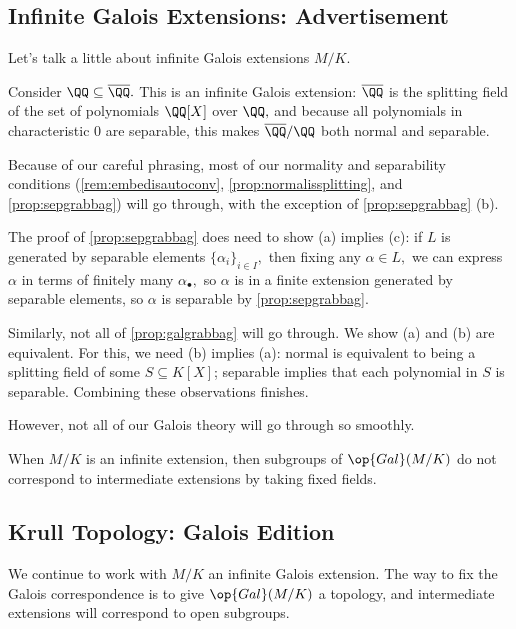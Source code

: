 \documentclass[../notes.tex]{subfiles}
\begin{document}
\subsection{Infinite Galois Extensions: Advertisement}
Let's talk a little about infinite Galois extensions $M/K.$
\begin{example}
	Consider $\QQ\subseteq\overline\QQ.$ This is an infinite Galois extension: $\overline\QQ$ is the splitting field of the set of polynomials $\QQ[X]$ over $\QQ,$ and because all polynomials in characteristic $0$ are separable, this makes $\overline\QQ/\QQ$ both normal and separable.
\end{example}
\begin{remark}[Nir]
	Because of our careful phrasing, most of our normality and separability conditions (\autoref{rem:embedisautoconv}, \autoref{prop:normalissplitting}, and \autoref{prop:sepgrabbag}) will go through, with the exception of \autoref{prop:sepgrabbag} (b).
	
	The proof of \autoref{prop:sepgrabbag} does need to show (a) implies (c): if $L$ is generated by separable elements $\{\alpha_i\}_{i\in I},$ then fixing any $\alpha\in L,$ we can express $\alpha$ in terms of finitely many $\alpha_\bullet,$ so $\alpha$ is in a finite extension generated by separable elements, so $\alpha$ is separable by \autoref{prop:sepgrabbag}.
\end{remark}
\begin{remark}[Nir]
	Similarly, not all of \autoref{prop:galgrabbag} will go through. We show (a) and (b) are equivalent. For this, we need (b) implies (a): normal is equivalent to being a splitting field of some $S\subseteq K[X]$; separable implies that each polynomial in $S$ is separable. Combining these observations finishes.
\end{remark}
However, not all of our Galois theory will go through so smoothly.
\begin{warn}
	When $M/K$ is an infinite extension, then subgroups of $\op{Gal}(M/K)$ do not correspond to intermediate extensions by taking fixed fields.
\end{warn}

\subsection{Krull Topology: Galois Edition}
We continue to work with $M/K$ an infinite Galois extension. The way to fix the Galois correspondence is to give $\op{Gal}(M/K)$ a topology, and intermediate extensions will correspond to open subgroups.
\end{document}
